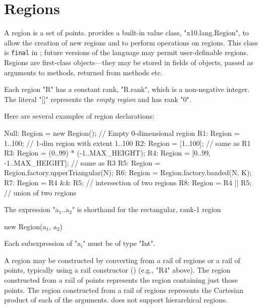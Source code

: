 \section{Regions}\label{XtenRegions}

A region is a set of points.  {}\Xten{}
provides a built-in value class, \xcd"x10.lang.Region", to allow the
creation of new regions and to perform operations on regions. This
class is {\tt final} in {}\XtenCurrVer; future versions of the
language may permit user-definable regions.
Regions are first-class
objects---they may be stored in fields of objects, passed as
arguments to methods, returned from methods etc.



Each region \xcd"R" has a constant rank, \xcd"R.rank", which is a
non-negative integer. The literal \xcd"[]" represents the {\em empty
region} and has rank \xcd"0".

Here are several examples of region declarations:
\begin{xten}
Null: Region = new Region();  // Empty 0-dimensional region          
R1: Region = 1..100; // 1-dim region with extent 1..100
R2: Region = [1..100]; // same as R1
R3: Region = (0..99) * (-1..MAX_HEIGHT);   
R4: Region = [0..99, -1..MAX_HEIGHT]; // same as R3  
R5: Region = Region.factory.upperTriangular(N);
R6: Region = Region.factory.banded(N, K);
R7: Region = R4 && R5; // intersection of two regions
R8: Region = R4 || R5; // union of two regions
\end{xten}

The expression \xcdmath"a$_1$..a$_2$"
is shorthand for the rectangular, rank-1 region
\begin{xtenmath}
new Region(a$_1$, a$_2$)
\end{xtenmath}
Each subexpression of \xcdmath"a$_i$" must be of type \xcd"Int".

A region may be constructed by converting from a rail of
regions or a rail of points, typically using a rail constructor
()
(e.g., \xcd"R4" above).
The region constructed from a rail of points represents the
region containing just those points.
The region constructed from a rail of regions
represents
the Cartesian product of each of the arguments.
\XtenCurrVer{} does not support hierarchical regions.


